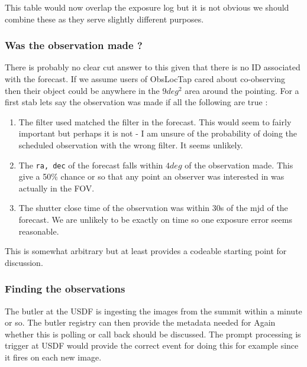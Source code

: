 This table would now overlap the exposure log but it is not obvious we should combine these as they serve slightly different purposes.

\subsubsection{Was the  observation made ?}\label{sec:made}
There is probably no clear cut answer to this given that there is no ID associated with the forecast.
If we assume users of ObsLocTap cared about co-observing then their object could be anywhere in the
$9 deg^2$ area around the pointing.
For a first stab lets say the observation was made if all the following are true :

\begin{enumerate}
\item The filter used matched the filter in the forecast.
This would seem to fairly important but perhaps it is not - I am unsure of the probability of
doing the scheduled observation with the wrong filter. It seems unlikely.
\item The {\tt ra, dec} of the forecast falls within $4 deg$ of the observation made.
This give a 50\% chance or so that any point an observer was interested in was actually in the FOV.
\item The shutter close time of the observation was within 30s of the mjd of the forecast.
We are unlikely to be exactly on time so one exposure error seems reasonable.
\end{enumerate}

This is somewhat arbitrary but at least provides a codeable starting point for discussion.

\subsubsection{Finding the observations}
The butler at the USDF is ingesting the images from the summit within a minute or so.
The butler registry can then provide the metadata needed for  
Again whether this is polling or call back should be discussed.
The prompt processing is trigger at USDF would provide the correct event for doing this for example
since it fires on each new image.
